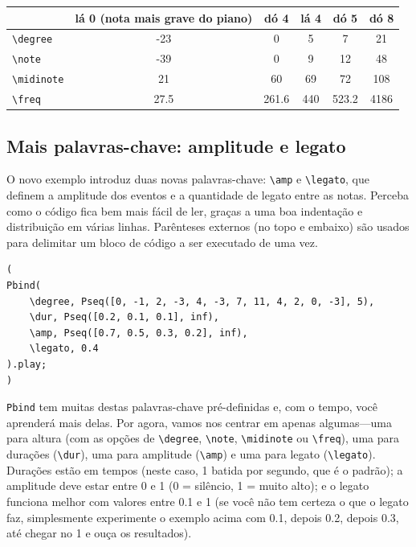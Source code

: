 \bigskip
{}
\bigskip


\begin{tabular}{|l|c|c|c|c|c|}
\hline 
  & \textbf{lá 0 (nota mais grave do piano)} & \textbf{dó 4} & \textbf{lá 4} & \textbf{dó 5} & \textbf{dó 8} \\ 
\hline 
\texttt{\textbackslash degree} & -23 & 0 & 5 & 7 & 21 \\
\hline
\texttt{\textbackslash note} & -39 & 0 & 9 & 12 & 48 \\
\hline
\texttt{\textbackslash midinote} & 21 & 60 & 69 & 72 & 108 \\
\hline
\texttt{\textbackslash freq} & 27.5 & 261.6 & 440 & 523.2 & 4186 \\
\hline
\end{tabular}
\bigskip


\subsection{Mais palavras-chave: amplitude e legato}

O novo exemplo introduz duas novas palavras-chave: \texttt{\textbackslash amp} e \texttt{\textbackslash legato}, que definem a amplitude dos eventos e a quantidade de legato entre as notas. Perceba como o código fica bem mais fácil de ler, graças a uma boa indentação e distribuição em várias linhas. Parênteses externos (no topo e embaixo) são usados para delimitar um bloco de código a ser executado de uma vez.

 
\begin{lstlisting}[style=SuperCollider-IDE, basicstyle=\scttfamily\footnotesize]
(
Pbind(
	\degree, Pseq([0, -1, 2, -3, 4, -3, 7, 11, 4, 2, 0, -3], 5),
	\dur, Pseq([0.2, 0.1, 0.1], inf),
	\amp, Pseq([0.7, 0.5, 0.3, 0.2], inf),
	\legato, 0.4
).play;
)
\end{lstlisting}
 

\texttt{Pbind} tem muitas destas palavras-chave pré-definidas e, com o tempo, você aprenderá mais delas. Por agora, vamos nos centrar em apenas algumas---uma para altura (com as opções de \texttt{\textbackslash degree}, \texttt{\textbackslash note}, \texttt{\textbackslash midinote} ou \texttt{\textbackslash freq}), uma para durações (\texttt{\textbackslash dur}), uma para amplitude (\texttt{\textbackslash amp}) e uma para legato (\texttt{\textbackslash legato}). Durações estão em tempos (neste caso, 1 batida por segundo, que é o padrão); a amplitude deve estar entre 0 e 1 (0 = silêncio, 1 = muito alto); e o legato funciona melhor com valores entre 0.1 e 1 (se você não tem certeza o que o legato faz, simplesmente experimente o exemplo acima com 0.1, depois 0.2, depois 0.3, até chegar no 1 e ouça os resultados).

